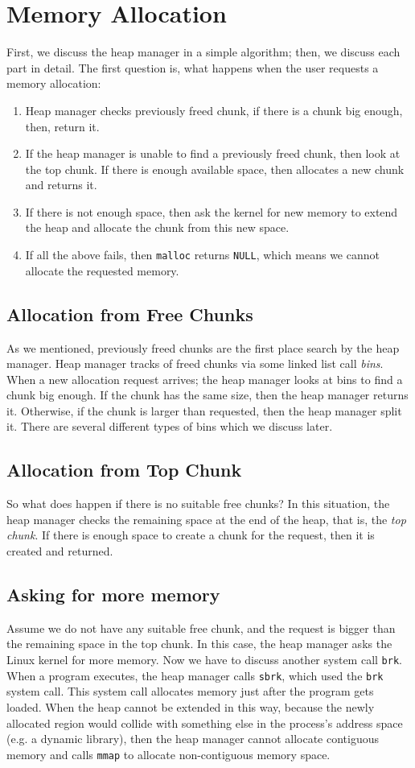 \documentclass{masterthesis}
\newcommand*\mallocc{\lstinline{malloc}\xspace}
\newcommand*\mmapc{\lstinline{mmap}\xspace}
\newcommand*\sbrkc{\lstinline{sbrk}\xspace}
\newcommand*\brkc{\lstinline{brk}\xspace}
\begin{document}
\section{Memory Allocation}
\label{sect:memoryallocation}
 First, we discuss the heap manager in a simple algorithm; then, we discuss each part in detail. The first question is, what happens when the user requests a memory allocation:
\begin{enumerate}
	\item Heap manager checks previously freed chunk, if there is a chunk big enough, then, return it.
	\item If the heap manager is unable to find a previously freed chunk, then look at the top chunk. If there is enough available space, then allocates a new chunk and returns it.
	\item If there is not enough space, then ask the kernel for new memory to extend the heap and allocate the chunk from this new space.
	\item If all the above fails, then \mallocc{} returns \lstinline{NULL}, which means we cannot allocate the requested memory.
\end{enumerate}

\subsection{Allocation from Free Chunks}
As we mentioned, previously freed chunks are the first place search by the heap manager. Heap manager tracks of freed chunks via some linked list call \emph{bins}. When a new allocation request arrives; the heap manager looks at bins to find a chunk big enough. If the chunk has the same size, then the heap manager returns it. Otherwise, if the chunk is larger than requested, then the heap manager split it. There are several different types of bins which we discuss later.

\subsection{Allocation from Top Chunk}
So what does happen if there is no suitable free chunks? In this situation, the heap manager checks the remaining space at the end of the heap, that is, the \emph{top chunk}. If there is enough space to create a chunk for the request, then it is created and returned.

\subsection{Asking for more memory}
Assume we do not have any suitable free chunk, and the request is bigger than the remaining space in the top chunk. In this case, the heap manager asks the Linux kernel for more memory. Now we have to discuss another system call \brkc. When a program executes, the heap manager calls \sbrkc, which used the \brkc system call. This system call allocates memory just after the program gets loaded.
When the heap cannot be extended in this way, because the newly allocated region would collide with something else in the process's address space (e.g. a dynamic library), then the heap manager cannot allocate contiguous memory and calls \mmapc{} to allocate non-contiguous memory space.
\end{document}
